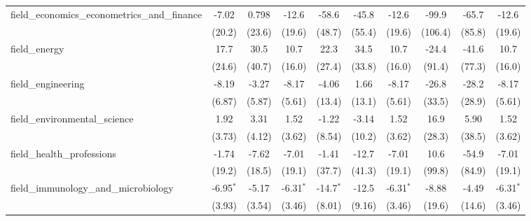 \begin{tabular}{lccccccccc}
   field\_economics\_econometrics\_and\_finance                & -7.02        & 0.798         & -12.6         & -58.6       & -45.8        & -12.6         & -99.9     & -65.7   & -12.6\\   
                                                               & (20.2)       & (23.6)        & (19.6)        & (48.7)      & (55.4)       & (19.6)        & (106.4)   & (85.8)  & (19.6)\\   
   field\_energy                                               & 17.7         & 30.5          & 10.7          & 22.3        & 34.5         & 10.7          & -24.4     & -41.6   & 10.7\\   
                                                               & (24.6)       & (40.7)        & (16.0)        & (27.4)      & (33.8)       & (16.0)        & (91.4)    & (77.3)  & (16.0)\\   
   field\_engineering                                          & -8.19        & -3.27         & -8.17         & -4.06       & 1.66         & -8.17         & -26.8     & -28.2   & -8.17\\   
                                                               & (6.87)       & (5.87)        & (5.61)        & (13.4)      & (13.1)       & (5.61)        & (33.5)    & (28.9)  & (5.61)\\   
   field\_environmental\_science                               & 1.92         & 3.31          & 1.52          & -1.22       & -3.14        & 1.52          & 16.9      & 5.90    & 1.52\\   
                                                               & (3.73)       & (4.12)        & (3.62)        & (8.54)      & (10.2)       & (3.62)        & (28.3)    & (38.5)  & (3.62)\\   
   field\_health\_professions                                  & -1.74        & -7.62         & -7.01         & -1.41       & -12.7        & -7.01         & 10.6      & -54.9   & -7.01\\   
                                                               & (19.2)       & (18.5)        & (19.1)        & (37.7)      & (41.3)       & (19.1)        & (99.8)    & (84.9)  & (19.1)\\   
   field\_immunology\_and\_microbiology                        & -6.95$^{*}$  & -5.17         & -6.31$^{*}$   & -14.7$^{*}$ & -12.5        & -6.31$^{*}$   & -8.88     & -4.49   & -6.31$^{*}$\\   
                                                               & (3.93)       & (3.54)        & (3.46)        & (8.01)      & (9.16)       & (3.46)        & (19.6)    & (14.6)  & (3.46)\\   

\end{tabular}
